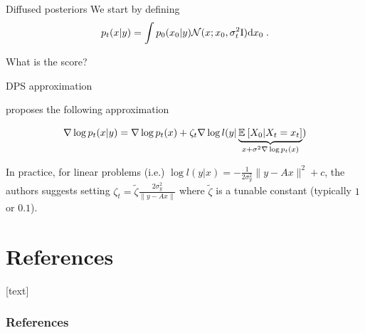 \documentclass[10pt]{beamer}
\begin{document}
\begin{frame}{Diffused posteriors}
    \vspace{-100pt}
    We start by defining
    \begin{equation}
      p_{t}(x | y) = \int p_{0}(x_{0} | y) \mathcal{N}(x; x_{0}, \sigma_t^2 \mathrm{I}) \mathrm{d} x_{0}\;.
    \end{equation}
    
    What is the score?
\end{frame}
\begin{frame}{DPS approximation \citep{chung2023diffusion}}

  \cite{chung2023diffusion} proposes the following approximation

  \begin{equation}
   \nabla \log p_{t}(x | y) = \nabla \log p_{t}(x) + \zeta_{t}\nabla \log l(y | \underbrace{\mathbb{E}_{}\left[X_0 | X_t = x_t\right]}_{x + \sigma^2 \nabla \log p_{t}(x)})
  \end{equation}

  \pause
  In practice, for linear problems (i.e.) $\log l(y | x) = -\frac{1}{2\sigma_y^2} \| y - Ax \|^2 + c$, the authors suggests setting $\zeta_{t} = \tilde{\zeta} \frac{2\sigma_y^2}{ \| y - Ax \|}$ where $\tilde{\zeta}$ is a tunable constant (typically $1$ or $0.1$).
\end{frame}
\section*{References}
[text]%
\begin{frame}[allowframebreaks]
\frametitle{References}
\small
\printbibliography
\normalsize
\end{frame}
\end{document}
